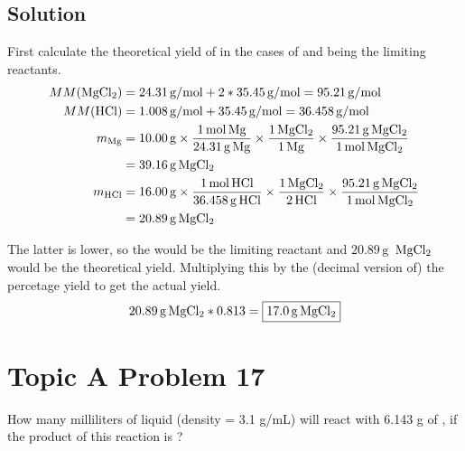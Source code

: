 \documentclass[10pt]{article}
\begin{document}
        \subsection{Solution}
            First calculate the theoretical yield of  in the cases of  and  being the limiting reactants.
            \begin{align}
                MM(\ce{MgCl2})  &=  24.31\,\unit{\gram/\mole} + 2 * 35.45\,\unit{\gram/\mole}
                    =   95.21\,\unit{\gram/\mole}\\
                MM(\ce{HCl})    &=  1.008\,\unit{\gram/\mole} + 35.45\,\unit{\gram/\mole}
                    =   36.458\,\unit{\gram/\mole}\\
                m_{\ce{Mg}}     &=  10.00\,\unit{\gram} \times  \frac{1\,\unit{\mole}\,\ce{Mg}}{24.31\,\unit{\gram}\,\ce{Mg}}
                                                        \times  \frac{1\,\ce{MgCl2}}{1\,\ce{Mg}}
                                                        \times  \frac{95.21\,\unit{\gram}\,\ce{MgCl2}}{1\,\unit{\mole}\,\ce{MgCl2}}\\
                                &=  39.16\,\unit{\gram}\,\ce{MgCl2}
                \\
                m_{\ce{HCl}}    &=  16.00\,\unit{\gram} \times  \frac{1\,\unit{\mole}\,\ce{HCl}}{36.458\,\unit{\gram}\,\ce{HCl}}
                                                        \times  \frac{1\,\ce{MgCl2}}{2\,\ce{HCl}}
                                                        \times  \frac{95.21\,\unit{\gram}\,\ce{MgCl2}}{1\,\unit{\mole}\,\ce{MgCl2}}\\
                                &=  20.89\,\unit{\gram}\,\ce{MgCl2}
            \end{align}

            The latter is lower, so the  would be the limiting reactant and $20.89\,\unit{\gram}$ $\,\ce{MgCl2}$ would be the theoretical yield.
            Multiplying this by the (decimal version of) the percetage yield to get the actual yield.
            \begin{gather}
                20.89\,\unit{\gram}\,\ce{MgCl2} * 0.813 = \boxed{17.0\,\unit{\gram}\,\ce{MgCl2}}
            \end{gather}

    \pagebreak
    \section{Topic A Problem 17}
        How many milliliters of liquid  (density = 3.1 g/mL) will react with 6.143 g of , if the product of this reaction is ?
\end{document}
